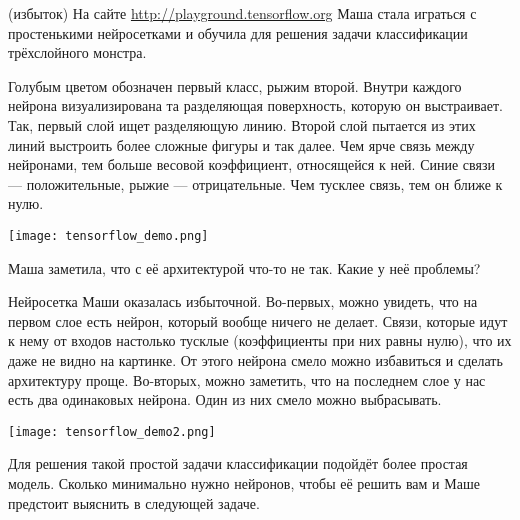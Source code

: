 


\begin{problem}{(избыток)}
На сайте \url{http://playground.tensorflow.org} Маша стала играться с простенькими нейросетками и  обучила для решения задачи классификации трёхслойного монстра. 

Голубым цветом обозначен первый класс, рыжим второй. Внутри каждого нейрона визуализирована та разделяющая поверхность, которую он выстраивает. Так, первый слой ищет разделяющую линию. Второй слой пытается из этих линий выстроить более сложные фигуры и так далее. Чем ярче связь между нейронами, тем больше весовой коэффициент, относящейся к ней. Синие связи --- положительные, рыжие --- отрицательные. Чем тусклее связь, тем он ближе к нулю.

\begin{center} 
\texttt{[image: tensorflow\_demo.png]}
\end{center} 

Маша заметила, что с её архитектурой что-то не так. Какие у неё проблемы?
\end{problem} 

\begin{sol}
Нейросетка Маши оказалась избыточной. Во-первых, можно увидеть, что на первом слое есть нейрон, который вообще ничего не делает. Связи, которые идут к нему от входов настолько тусклые (коэффициенты при них равны нулю), что их даже не видно на картинке. От этого нейрона смело можно избавиться и сделать архитектуру проще.  Во-вторых, можно заметить, что на последнем слое у нас есть два одинаковых нейрона. Один из них смело можно выбрасывать. 

\begin{center} 
\texttt{[image: tensorflow\_demo2.png]}
\end{center} 


Для решения такой простой задачи классификации подойдёт более простая модель. Сколько минимально нужно нейронов, чтобы её решить вам и Маше предстоит выяснить в следующей задаче. 
\end{sol}



